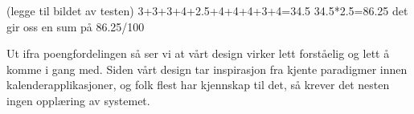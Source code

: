 (legge til bildet av testen)
3+3+3+4+2.5+4+4+4+3+4=34.5
34.5*2.5=86.25
det gir oss en sum på 86.25/100

Ut ifra poengfordelingen så ser vi at vårt design virker lett forståelig og lett å komme i gang med. Siden vårt design tar inspirasjon fra kjente paradigmer innen kalenderapplikasjoner, og folk flest har kjennskap til det, så krever det nesten ingen opplæring av systemet.